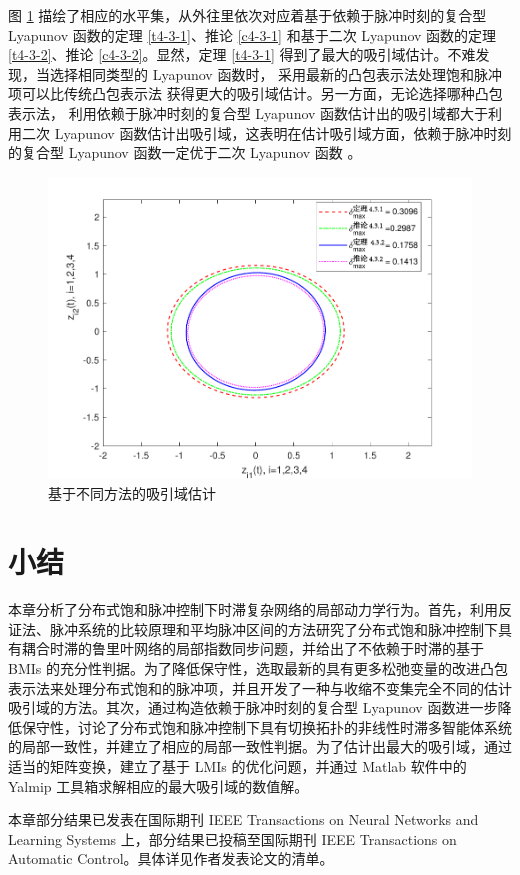 图 \ref{f4-13} 描绘了相应的水平集，从外往里依次对应着基于依赖于脉冲时刻的复合型 Lyapunov 函数的定理 \ref{t4-3-1}、推论 \ref{c4-3-1} 和基于二次 Lyapunov 函数的定理 \ref{t4-3-2}、推论 \ref{c4-3-2}。显然，定理 \ref{t4-3-1} 得到了最大的吸引域估计。不难发现，当选择相同类型的 Lyapunov 函数时， 采用最新的凸包表示法处理饱和脉冲项可以比传统凸包表示法 \cite{2014Global499,2017Global1270, 2018StabilityLi,2020Performance734,2013Adaptive1545,2018Event4391,2020Consensus194,2020Adaptive3013960,2019dynamic1699,li2020impulsive,shen2019estimation,HE2021126452,ouyang2020impulsive} 获得更大的吸引域估计。另一方面，无论选择哪种凸包表示法， 利用依赖于脉冲时刻的复合型 Lyapunov 函数估计出的吸引域都大于利用二次 Lyapunov 函数估计出吸引域，这表明在估计吸引域方面，依赖于脉冲时刻的复合型 Lyapunov 函数一定优于二次 Lyapunov 函数 \cite{2013Analysis871,2014Global499,2017Global1270,2020Performance734,2013Adaptive1545,2018Event4391,2020Consensus194,2020Adaptive3013960}。  
\begin{figure}[H]
    \centering
    \includegraphics[scale=0.75 ]{./ch4/fig4-13.pdf}
    \caption{ 基于不同方法的吸引域估计}
    \label{f4-13}
\end{figure} 
\section{小结}

本章分析了分布式饱和脉冲控制下时滞复杂网络的局部动力学行为。首先，利用反证法、脉冲系统的比较原理和平均脉冲区间的方法研究了分布式饱和脉冲控制下具有耦合时滞的鲁里叶网络的局部指数同步问题，并给出了不依赖于时滞的基于 BMIs 的充分性判据。为了降低保守性，选取最新的具有更多松弛变量的改进凸包表示法来处理分布式饱和的脉冲项，并且开发了一种与收缩不变集完全不同的估计吸引域的方法。其次，通过构造依赖于脉冲时刻的复合型 Lyapunov 函数进一步降低保守性，讨论了分布式饱和脉冲控制下具有切换拓扑的非线性时滞多智能体系统的局部一致性，并建立了相应的局部一致性判据。为了估计出最大的吸引域，通过适当的矩阵变换，建立了基于 LMIs 的优化问题，并通过 Matlab 软件中的 Yalmip 工具箱求解相应的最大吸引域的数值解。  

本章部分结果已发表在国际期刊  IEEE Transactions on Neural Networks and Learning Systems 上，部分结果已投稿至国际期刊 IEEE
Transactions on Automatic Control。具体详见作者发表论文的清单。
